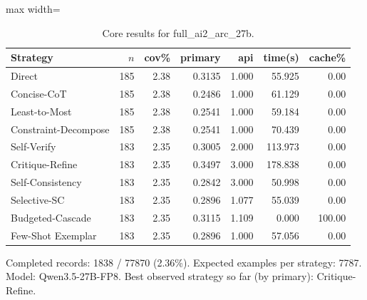\documentclass[10pt,twocolumn]{article}
\begin{document}
\begin{table}[t]
\centering
\caption{Core results for full\_ai2\_arc\_27b.}
\label{tab:full_ai2_arc_27b_core}
\begin{adjustbox}{max width=\textwidth}
\begin{tabular}{lrrrrrr}
\toprule
Strategy & $n$ & cov\% & primary & api & time(s) & cache\% \\
\midrule
Direct & 185 & 2.38 & 0.3135 & 1.000 & 55.925 & 0.00 \\
Concise-CoT & 185 & 2.38 & 0.2486 & 1.000 & 61.129 & 0.00 \\
Least-to-Most & 185 & 2.38 & 0.2541 & 1.000 & 59.184 & 0.00 \\
Constraint-Decompose & 185 & 2.38 & 0.2541 & 1.000 & 70.439 & 0.00 \\
Self-Verify & 183 & 2.35 & 0.3005 & 2.000 & 113.973 & 0.00 \\
Critique-Refine & 183 & 2.35 & 0.3497 & 3.000 & 178.838 & 0.00 \\
Self-Consistency & 183 & 2.35 & 0.2842 & 3.000 & 50.998 & 0.00 \\
Selective-SC & 183 & 2.35 & 0.2896 & 1.077 & 55.039 & 0.00 \\
Budgeted-Cascade & 183 & 2.35 & 0.3115 & 1.109 & 0.000 & 100.00 \\
Few-Shot Exemplar & 183 & 2.35 & 0.2896 & 1.000 & 57.056 & 0.00 \\
\bottomrule
\end{tabular}
\end{adjustbox}
\vspace{2pt}\parbox{0.98\textwidth}{\footnotesize Completed records: 1838 / 77870 (2.36\%). Expected examples per strategy: 7787. Model: Qwen3.5-27B-FP8. Best observed strategy so far (by primary): Critique-Refine.}
\end{table}
\end{document}
